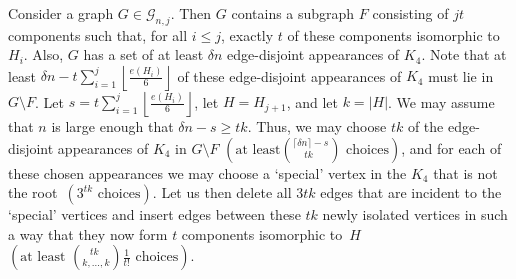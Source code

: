 \documentclass{article}
\newtheorem{Proof of Theorem}{Proof of Theorem}
\begin{document}
Consider a graph $G \in \mathcal{G}_{n,j}$.
Then $G$ contains a subgraph $F$ consisting of $jt$ components such that,
for all $i \leq j$,
exactly $t$ of these components isomorphic to $H_{i}$.
Also, $G$ has a set of at least $\delta n$ edge-disjoint appearances of $K_{4}$.
Note that at least $\delta n - t \sum_{i=1}^{j} \left \lfloor \frac{e(H_{i})}{6} \right \rfloor$
of these edge-disjoint appearances of $K_{4}$ must lie in $G \setminus F$.
Let $s= t \sum_{i=1}^{j} \left \lfloor \frac{e(H_{i})}{6} \right \rfloor$,
let $H=H_{j+1}$,
and let $k=|H|$.
We may assume that $n$ is large enough that $\delta n - s \geq tk$.
Thus, we may choose $tk$ of the edge-disjoint appearances of $K_{4}$ in $G \setminus F$
$\left( \textrm{at least} \left( ^{\lceil \delta n \rceil -s} _{\phantom{wq}tk} \right) \textrm{ choices} \right)$,
and for each of these chosen appearances we may choose a `special' vertex in the $K_{4}$ that is not the 
root~$\left( 3^{tk} \textrm{ choices} \right)$.
Let us then delete all $3tk$ edges that are incident to the `special' vertices and 
insert edges between these $tk$ newly isolated vertices in such a way that they now form $t$ components
isomorphic to~$H$ 
$\left( \textrm{at least } \left( ^{\phantom{qi}tk} _{k, \ldots, k} \right) \frac{1}{t!} \textrm{ choices} \right)$.
\end{document}
